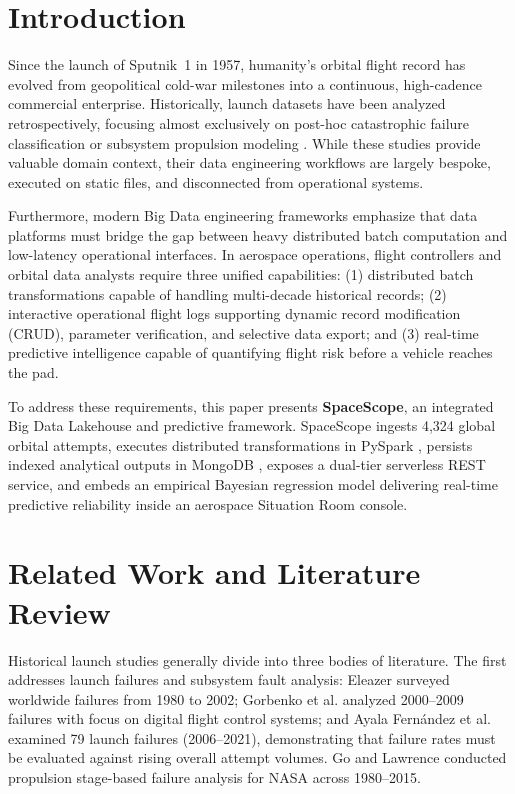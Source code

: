 \documentclass[10pt]{article}
\begin{document}
\section{Introduction}

Since the launch of Sputnik~1 in 1957, humanity's orbital flight record has evolved from geopolitical cold-war milestones into a continuous, high-cadence commercial enterprise. Historically, launch datasets have been analyzed retrospectively, focusing almost exclusively on post-hoc catastrophic failure classification \cite{ref1,ref2,ref3} or subsystem propulsion modeling \cite{ref4,ref5,ref6}. While these studies provide valuable domain context, their data engineering workflows are largely bespoke, executed on static files, and disconnected from operational systems.

Furthermore, modern Big Data engineering frameworks \cite{ref11,ref12,ref13,ref14,ref15} emphasize that data platforms must bridge the gap between heavy distributed batch computation and low-latency operational interfaces. In aerospace operations, flight controllers and orbital data analysts require three unified capabilities: (1) distributed batch transformations capable of handling multi-decade historical records; (2) interactive operational flight logs supporting dynamic record modification (CRUD), parameter verification, and selective data export; and (3) real-time predictive intelligence capable of quantifying flight risk before a vehicle reaches the pad.

To address these requirements, this paper presents \textbf{SpaceScope}, an integrated Big Data Lakehouse and predictive framework. SpaceScope ingests 4,324 global orbital attempts, executes distributed transformations in PySpark \cite{ref16}, persists indexed analytical outputs in MongoDB \cite{ref19,ref24}, exposes a dual-tier serverless REST service, and embeds an empirical Bayesian regression model delivering real-time predictive reliability inside an aerospace Situation Room console.

\section{Related Work and Literature Review}

Historical launch studies generally divide into three bodies of literature. The first addresses launch failures and subsystem fault analysis: Eleazer \cite{ref1} surveyed worldwide failures from 1980 to 2002; Gorbenko et al. \cite{ref2} analyzed 2000--2009 failures with focus on digital flight control systems; and Ayala Fernández et al. \cite{ref3} examined 79 launch failures (2006--2021), demonstrating that failure rates must be evaluated against rising overall attempt volumes. Go and Lawrence \cite{ref4} conducted propulsion stage-based failure analysis for NASA across 1980--2015.
\end{document}
